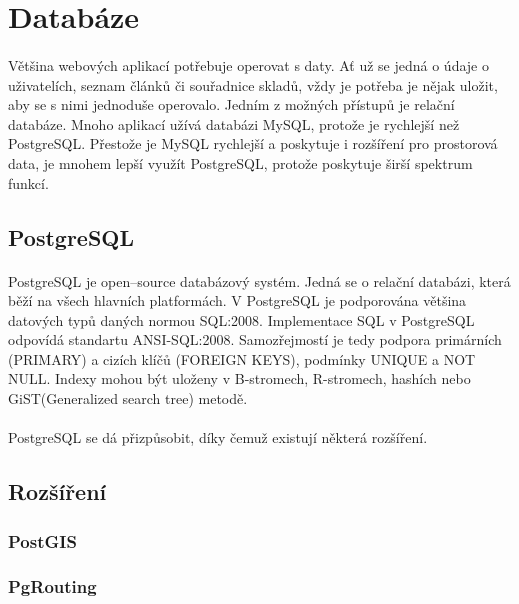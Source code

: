 \documentclass[11pt,a4paper,titlepage,oneside]{book}
\begin{document}
	\section{Databáze}
		\paragraph{} Většina webových aplikací potřebuje operovat s daty. Ať už se jedná o údaje o uživatelích, seznam článků či souřadnice skladů, vždy je potřeba je nějak uložit, aby se s nimi jednoduše operovalo. Jedním z možných přístupů je relační databáze. Mnoho aplikací užívá databázi MySQL, protože je rychlejší než PostgreSQL. Přestože je MySQL rychlejší a poskytuje i rozšíření pro prostorová data, je mnohem lepší využít PostgreSQL, protože poskytuje širší spektrum funkcí.
		\subsection{PostgreSQL}
			\paragraph{} PostgreSQL je open--source databázový systém. Jedná se o relační databázi, která běží na všech hlavních platformách. V PostgreSQL je podporována většina datových typů daných normou SQL:2008. Implementace SQL v PostgreSQL odpovídá standartu ANSI-SQL:2008\cite{postgresql}. Samozřejmostí je tedy podpora primárních (PRIMARY) a cizích klíčů (FOREIGN KEYS), podmínky UNIQUE a NOT NULL. Indexy mohou být uloženy v B-stromech, R-stromech, hashích nebo GiST(Generalized search tree) metodě.
			\paragraph{} PostgreSQL se dá přizpůsobit, díky čemuž existují některá rozšíření.
		\subsection{Rozšíření}
			\subsubsection{PostGIS}
				\paragraph{}
			\subsubsection{PgRouting}
\end{document}
